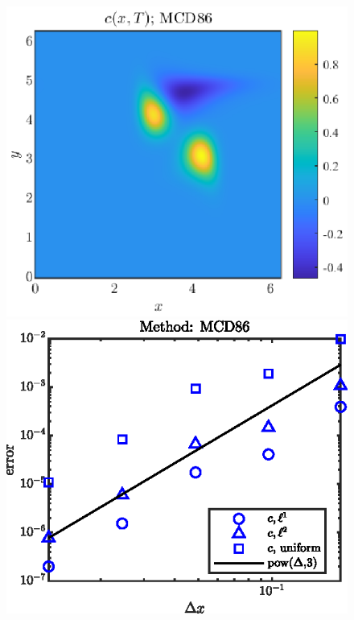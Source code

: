 \documentclass[11pt,letterpaper]{article}
\begin{document}
\begin{figure}[H]
    \centering
    \includegraphics{figs/c_final_MCD86}
    \includegraphics{figs/conv_order_MCD86}
    \caption{}\label{fig:c_final_MCD86}
\end{figure}
\end{document}
